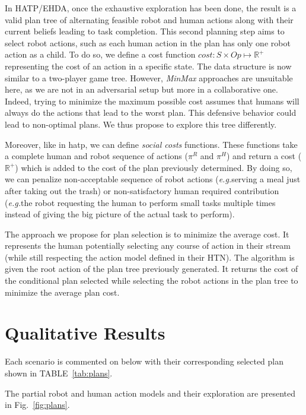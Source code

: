 In HATP/EHDA, once the exhaustive exploration has been done, the result is a valid plan tree of alternating feasible robot and human actions along with their current beliefs leading to task completion. This second planning step aims to select robot actions, such as each human action in the plan has only one robot action as a child.
To do so, we define a cost function $cost: S \times Op \mapsto \mathbb{R}^+$ representing the cost of an action in a specific state. The data structure is now similar to a two-player game tree. However, \textit{MinMax} approaches are unsuitable here, as we are not in an adversarial setup but more in a collaborative one. Indeed, trying to minimize the maximum possible cost assumes that humans will always do the actions that lead to the worst plan. This defensive behavior could lead to non-optimal plans. We thus propose to explore this tree differently.

Moreover, like in \acrshort{hatp}, we can define \textit{social costs} functions. These functions take a complete human and robot sequence of actions ($\pi^R$ and $\pi^H$) and return a cost ($\mathbb{R}^+$) which is added to the cost of the plan previously determined. By doing so, we can penalize non-acceptable sequence of robot actions (\textit{e.g.}serving a meal just after taking out the trash) or non-satisfactory human required contribution (\textit{e.g.}the robot requesting the human to perform small tasks multiple times instead of giving the big picture of the actual task to perform).

The approach we propose for plan selection is to minimize the average cost. It represents the human potentially selecting any course of action in their stream (while still respecting the action model defined in their HTN).
The algorithm is given the root action of the plan tree previously generated. It returns the cost of the conditional plan selected while selecting the robot actions in the plan tree to minimize the average plan cost.

\section{Qualitative Results}

Each scenario is commented on below with their corresponding selected plan shown in TABLE~\ref{tab:plans}.

The partial robot and human action models and their exploration are presented in Fig.~\ref{fig:plans}.

